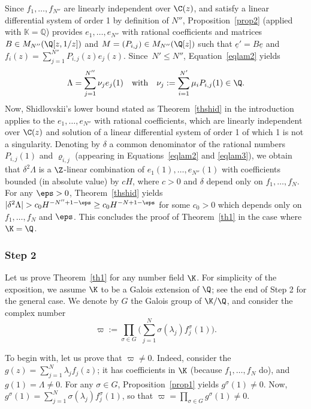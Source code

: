 Since $f_1,\ldots,f_{N''}$ are linearly independent over $\C(z)$, and satisfy a linear differential system of order 1 by definition of $N''$, Proposition~\ref{prop2} (applied with $\mathbb K=\mathbb Q$) provides \Efunctions $e_1,\ldots,e_{N''}$ with rational coefficients and matrices $B\in M_{N''}(\Q[z,1/z])$ and $M = (P_{i,j})\in M_{N''}(\Q[z])$ such that $\underline e' = B \underline e$ and $f_i(z) = \sum_{j=1}^{N''} P_{i,j}(z)e_j(z)$. Since~$N'\leq N''$, Equation~\eqref{eqlam2} yields
\begin{equation}\label{eqlam3}
\Lambda = \sum_{j=1}^{N''} \nu_j e_j(1) \quad \mbox{with} \quad
\nu_j := \sum_{i=1}^{N'} \mu_i P_{i,j}(1)\in\Q.
\end{equation}
Now, Shidlovskii's lower bound stated as Theorem~\ref{thshid} in the introduction
applies to the \Efunctions $e_1,\ldots,e_{N''}$ with rational coefficients, which are linearly independent over $\C(z)$ and solution of a linear differential system of order 1 of which 1 is not a singularity. Denoting by $\delta$ a common denominator of the rational numbers $P_{i,j}(1)$ and $\varrho_{i,j} $ (appearing in Equations~\eqref{eqlam2} and \eqref{eqlam3}), we obtain that $\delta^2 \Lambda $ is a $\Z$-linear combination of $e_1(1),\ldots,e_{N''}(1)$ with coefficients bounded (in absolute value) by $cH$, where $c>0$ and $\delta$ depend only on $f_1,\ldots,f_N$. For any $\eps>0$, Theorem~\ref{thshid} yields $ |\delta^2 \Lambda |>c_0 H^{-N''+1-\eps}\geq c_0 H^{-N+1-\eps}$ for some $c_0>0$ which depends only on $f_1,\ldots,f_N$ and $\eps$. This concludes the proof of Theorem~\ref{th1} in the case where $\K=\Q$.

\subsubsection*{Step 2}
Let us prove Theorem~\ref{th1} for any number field $\K$. For simplicity of the exposition, we assume $\K$ to be a Galois extension of $\Q$; see the end of Step 2 for the general case. We denote by $G$ the Galois group of $\K/\Q$, and consider the complex number
\begin{equation} \label{eqdefvarpi}
\varpi := \prod_{\sigma\in G} \Big( \sum_{j=1}^N \sigma(\lambda_j) f_j^\sigma(1)\Big).
\end{equation}

To begin with, let us prove that $ \varpi \neq 0$. Indeed, consider the \Efunction $g(z) = \sum_{j=1}^N \lambda_j f_j(z)$; it has coefficients in $\K$ (because $f_1,\ldots,f_N$ do), and $g(1) = \Lambda\neq 0$. For any $\sigma \in G$, Proposition~\ref{prop1} yields $g^\sigma(1) \neq 0$. Now, $g^\sigma(1) = \sum_{j=1}^N \sigma(\lambda_j) f_j^\sigma(1)$, so that $\varpi = \prod_{\sigma\in G} g^\sigma(1) \neq 0$.

